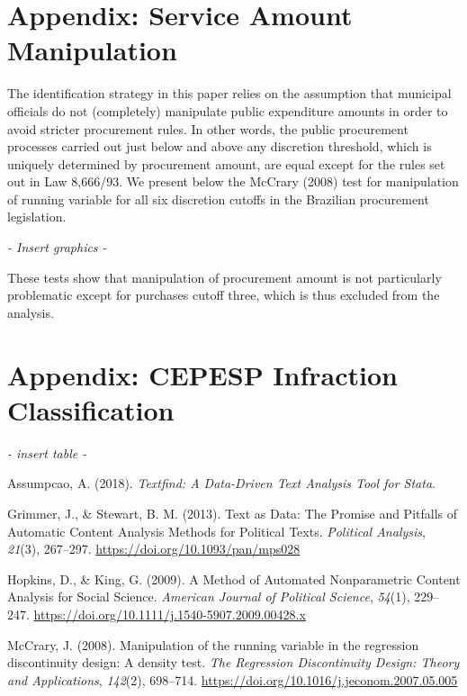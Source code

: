 \documentclass[]{article}
\theoremstyle{definition}
\theoremstyle{definition}
\theoremstyle{definition}
\theoremstyle{remark}
\begin{document}
\hypertarget{appendixB}{%
\section{Appendix: Service Amount Manipulation}\label{appendixB}}

The identification strategy in this paper relies on the assumption that
municipal officials do not (completely) manipulate public expenditure
amounts in order to avoid stricter procurement rules. In other words,
the public procurement processes carried out just below and above any
discretion threshold, which is uniquely determined by procurement
amount, are equal except for the rules set out in Law 8,666/93. We
present below the McCrary (2008) test for manipulation of running
variable for all six discretion cutoffs in the Brazilian procurement
legislation.

\emph{- Insert graphics -}

These tests show that manipulation of procurement amount is not
particularly problematic except for purchases cutoff three, which is
thus excluded from the analysis.

\hypertarget{appendixC}{%
\section{Appendix: CEPESP Infraction Classification}\label{appendixC}}

\emph{- insert table - }

\hypertarget{refs}{}
\leavevmode\hypertarget{ref-AssumpcaotextfindDataDrivenText2018}{}%
Assumpcao, A. (2018). \emph{Textfind: A Data-Driven Text Analysis Tool
for Stata}.

\leavevmode\hypertarget{ref-GrimmerTextDataPromise2013a}{}%
Grimmer, J., \& Stewart, B. M. (2013). Text as Data: The Promise and
Pitfalls of Automatic Content Analysis Methods for Political Texts.
\emph{Political Analysis}, \emph{21}(3), 267--297.
\url{https://doi.org/10.1093/pan/mps028}

\leavevmode\hypertarget{ref-HopkinsMethodAutomatedNonparametric2009}{}%
Hopkins, D., \& King, G. (2009). A Method of Automated Nonparametric
Content Analysis for Social Science. \emph{American Journal of Political
Science}, \emph{54}(1), 229--247.
\url{https://doi.org/10.1111/j.1540-5907.2009.00428.x}

\leavevmode\hypertarget{ref-McCraryManipulationrunningvariable2008}{}%
McCrary, J. (2008). Manipulation of the running variable in the
regression discontinuity design: A density test. \emph{The Regression
Discontinuity Design: Theory and Applications}, \emph{142}(2), 698--714.
\url{https://doi.org/10.1016/j.jeconom.2007.05.005}
\end{document}
